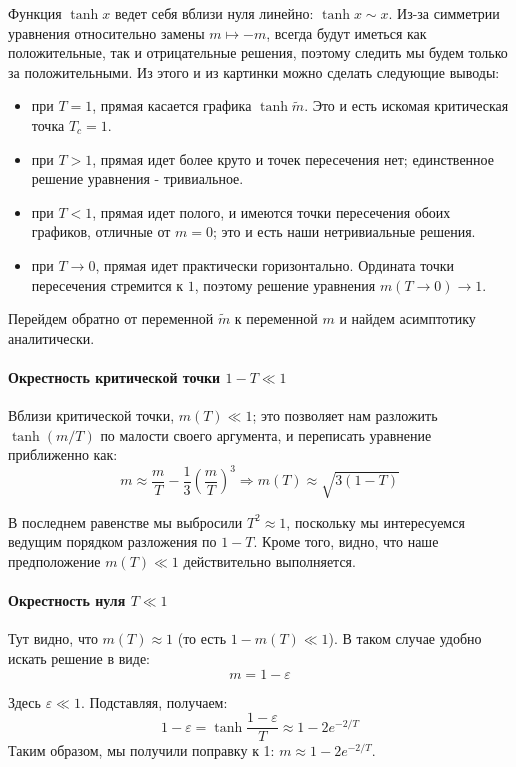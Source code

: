 \documentclass[a4paper,12pt]{article}
\begin{document}
\noindent
Функция $\tanh x$ ведет себя вблизи нуля линейно: $\tanh x\sim x$.
Из-за симметрии уравнения относительно замены $m\mapsto-m$, всегда
будут иметься как положительные, так и отрицательные решения, поэтому
следить мы будем только за положительными. Из этого и из картинки
можно сделать следующие выводы:
\begin{itemize}
	\item при $T=1$, прямая касается графика $\tanh\tilde{m}$. Это и есть
	искомая критическая точка $T_{c}=1$.
	\item при $T>1$, прямая идет более круто и точек пересечения нет; единственное
	решение уравнения - тривиальное.
	\item при $T<1$, прямая идет полого, и имеются точки пересечения обоих
	графиков, отличные от $m=0$; это и есть наши нетривиальные решения.
	\item при $T\to0$, прямая идет практически горизонтально. Ордината точки
	пересечения стремится к $1$, поэтому решение уравнения $m(T\to0)\to1$.
\end{itemize}
Перейдем обратно от переменной $\tilde{m}$ к переменной $m$ и найдем
асимптотику аналитически. 


\paragraph{Окрестность критической точки $1-T\ll1$}

Вблизи критической точки, $m(T)\ll1$; это позволяет нам разложить
$\tanh(m/T)$ по малости своего аргумента, и переписать уравнение
приближенно как:
\[
m\approx\frac{m}{T}-\frac{1}{3}\left(\frac{m}{T}\right)^{3}\Rightarrow m(T)\approx\sqrt{3(1-T)}
\]

\noindent
В последнем равенстве мы выбросили $T^{2}\approx1$, поскольку мы
интересуемся ведущим порядком разложения по $1-T$. Кроме того, видно,
что наше предположение $m(T)\ll1$ действительно выполняется.


\paragraph{Окрестность нуля $T\ll1$}

Тут видно, что $m(T)\approx1$ (то есть $1-m(T)\ll1$). В таком случае удобно искать решение в виде:
\[
m=1-\varepsilon
\]

\noindent
Здесь $\varepsilon\ll1$. Подставляя, получаем:
$$
1-\varepsilon=\tanh\frac{1-\varepsilon}{T}\approx1-2e^{-2/T}
$$
Таким образом, мы получили поправку к 1: $m\approx1-2e^{-2/T}$.
\end{document}
